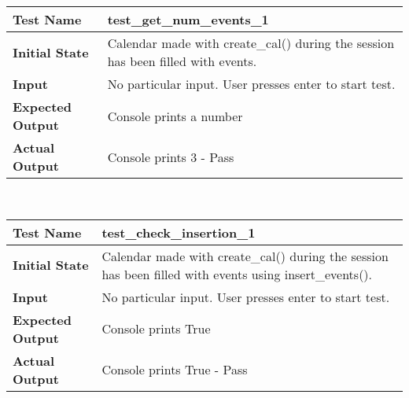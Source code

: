\documentclass[12pt, titlepage]{article}
\begin{document}
            \hfill	%
		\begin{table}[!htbp]
			\begin{tabularx}{\textwidth}{|l|X|}%
				\hline
                \textbf{Test Name} & test\_get\_num\_events\_1
                \\\hline
                \textbf{Initial State} & Calendar made with create\_cal() during the session has been filled with events.
                \\\hline
                \textbf{Input} & No particular input. User presses enter to start test.
                \\\hline 
                \textbf{Expected Output} & Console prints a number
                \\\hline
                \textbf{Actual Output} & Console prints 3 - Pass
                \\\hline
			\end{tabularx}\\ %
    	\end{table}	
            \hfill	%

\newpage  %
            
		\begin{table}[!htbp]
			\begin{tabularx}{\textwidth}{|l|X|}%
				\hline
                \textbf{Test Name} & test\_check\_insertion\_1
                \\\hline
                \textbf{Initial State} & Calendar made with create\_cal() during the session has been filled with events using insert\_events().
                \\\hline
                \textbf{Input} & No particular input. User presses enter to start test.
                \\\hline 
                \textbf{Expected Output} & Console prints True
                \\\hline
                \textbf{Actual Output} & Console prints True - Pass
                \\\hline
			\end{tabularx}\\ %
    	\end{table}	
            \hfill	%
        
\end{document}
